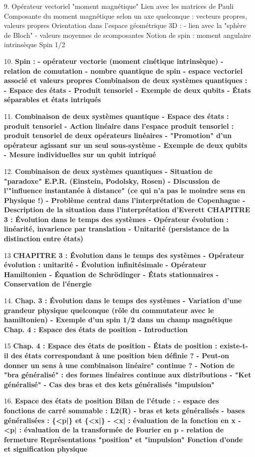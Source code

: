 9.
Opérateur vectoriel "moment magnétique"
Lien avec les matrices de Pauli
Composante du moment magnétique selon un axe quelconque : vecteurs propres, valeurs propres
Orientation dans l'espace géométrique 3D :
- lien avec la "sphère de Bloch"
- valeurs moyennes de scomposantes
Notion de spin : moment angulaire intrinsèque
Spin 1/2

10.
\bf{Spin :}
- opérateur vectorie (moment cinétique intrinsèque)
- relation de comutation
- nombre quantique de spin
- espace vectoriel associé et valeurs propres
\bf{Combinaison de deux systèmes quantiques :}
- Espace des états
- Produit tensoriel
- Exemple de deux qubits
- États séparables et états intriqués

11.
\bf{Combinaison de deux systèmes quantique}
- Espace des états : produit tensoriel
- Action linéaire dans l'espace produit tensoriel : produit tensoriel de deux opérateurs linéaires
- "Promotion" d'un opérateur agissant sur un seul sous-système
- Exemple de deux qubits
- Mesure individuelles sur un qubit intriqué

12.
\bf{Combinaison de deux systèmes quantiques}
- Situation de "paradoxe" E.P.R. (Einstein, Podolsky, Rosen)
- Discussion de l'"influence instantanée à distance" (ce qui n'a pas le moindre sens en Physique !)
- Problème central dans l'interprétation de Copenhague
- Description de la situation dans l'interprétation d'Everett
\bf{CHAPITRE 3 : Évolution dans le temps des systèmes}
- Opérateur évolution : linéarité, invarience par translation
- Unitarité (persistance de la distinction entre états)

13
\bf{CHAPITRE 3 : Évolution dans le temps des systèmes}
- Opérateur évolution : unitarité
- Évolution infinitésimale
- Opérateur Hamiltonien
- Équation de Schrödinger
- États stationnaires
- Conservation de l'énergie

14.
\bf{Chap. 3 : Évolution dans le temps des systèmes}
- Variation d'une grandeur physique quelconque (rôle du commutateur avec le hamiltonien)
- Exemple d'un spin 1/2 dans un champ magnétique
\bf{Chap. 4 : Espace des états de position}
- Introduction

15
\bf{Chap. 4 : Espace des états de position}
- États de position : existe-t-il des états correspondant à une position bien définie ?
- Peut-on donner un sens à une combinaison linéaire" continue ?
- Notion de "bra généralisé" : des formes linéaires continue aux distributions
- "Ket généralisé"
- Cas des bras et des kets généralisés "impulsion"

16.
\bf{Espace des états de position}
Bilan de l'étude :
- espace des fonctions de carré sommable : L2(R)
- bras et kets généralisés
- bases généralisées : \{<p|\} et \{<x|\}
- <x| : évaluation de la fonction en x
- <p| : évaluation de la transformée de Fourier en p
- relation de fermeture
Représentations "position" et "impulsion"
Fonction d'onde et signification physique

